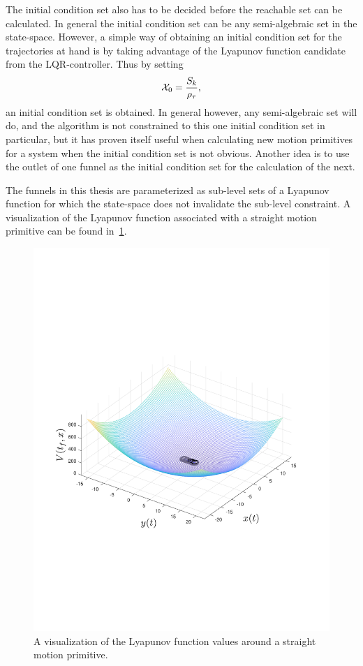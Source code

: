 The initial condition set also has to be decided before the reachable set can be
calculated. In general the initial condition set can be any semi-algebraic set
in the state-space. However, a simple way of obtaining an initial condition set
for the trajectories at hand is by taking advantage of the Lyapunov function
candidate from the \ac{LQR}-controller. Thus by setting
\begin{equation}
  \mathcal{X}_{0} = \frac{ S_{k}}{\rho_{\tau}},
\end{equation}
an initial condition set is obtained. In general however, any semi-algebraic set
will do, and the algorithm is not constrained to this one initial condition set
in particular, but it has proven itself useful when calculating new motion
primitives for a system when the initial condition set is not obvious. Another
idea is to use the outlet of one funnel as the initial condition set for the
calculation of the next.

The funnels in this thesis are parameterized as sub-level sets of a Lyapunov
function for which the state-space does not invalidate the sub-level constraint.
A visualization of the Lyapunov function associated with a straight motion
primitive can be found in~\cref{fig:visualized-lyapunov}.
\begin{figure}
  \centering \includegraphics[trim={3cm 7cm 3cm 7cm},
  scale=.6]{figures/rrtfunnel/straight-funnel-lyapunov-3d}
  \caption[The Lyapunov function visualized around a straight trajector]{A visualization of the Lyapunov function values around a straight
    motion primitive.}
  \label{fig:visualized-lyapunov}
\end{figure}

